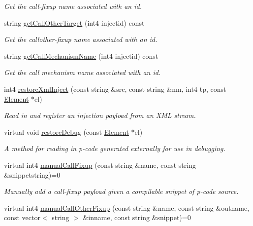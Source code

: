 \begin{DoxyCompactItemize}
\begin{DoxyCompactList}\small\item\em Get the call-\/fixup name associated with an id. \end{DoxyCompactList}\item 
string \mbox{\hyperlink{class_pcode_inject_library_a928588313e2dfb9454b65f932985d97c}{get\+Call\+Other\+Target}} (int4 injectid) const
\begin{DoxyCompactList}\small\item\em Get the callother-\/fixup name associated with an id. \end{DoxyCompactList}\item 
string \mbox{\hyperlink{class_pcode_inject_library_aaf5cb3c65ea01b0db1d38777f23b8796}{get\+Call\+Mechanism\+Name}} (int4 injectid) const
\begin{DoxyCompactList}\small\item\em Get the call mechanism name associated with an id. \end{DoxyCompactList}\item 
int4 \mbox{\hyperlink{class_pcode_inject_library_a738666065a924346cf552b1d62c84848}{restore\+Xml\+Inject}} (const string \&src, const string \&nm, int4 tp, const \mbox{\hyperlink{class_element}{Element}} $\ast$el)
\begin{DoxyCompactList}\small\item\em Read in and register an injection payload from an X\+ML stream. \end{DoxyCompactList}\item 
virtual void \mbox{\hyperlink{class_pcode_inject_library_a48cebdddd48a1fa5db300d80ed6bdaa2}{restore\+Debug}} (const \mbox{\hyperlink{class_element}{Element}} $\ast$el)
\begin{DoxyCompactList}\small\item\em A method for reading in p-\/code generated externally for use in debugging. \end{DoxyCompactList}\item 
virtual int4 \mbox{\hyperlink{class_pcode_inject_library_a0e360443cbc6ff94ea71d197882c55a8}{manual\+Call\+Fixup}} (const string \&name, const string \&snippetstring)=0
\begin{DoxyCompactList}\small\item\em Manually add a call-\/fixup payload given a compilable snippet of p-\/code {\itshape source}. \end{DoxyCompactList}\item 
virtual int4 \mbox{\hyperlink{class_pcode_inject_library_a93f4e4b0f75d81b96bd92623d392269a}{manual\+Call\+Other\+Fixup}} (const string \&name, const string \&outname, const vector$<$ string $>$ \&inname, const string \&snippet)=0

\end{DoxyCompactItemize}
